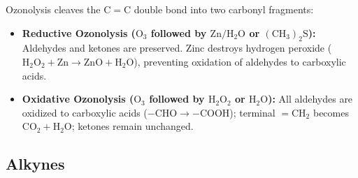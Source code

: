 \documentclass[10pt,a4paper]{article}
\begin{document}
\begin{ncertbox}
Ozonolysis cleaves the $\mathrm{C=C}$ double bond into two carbonyl fragments:
\begin{itemize}
  \item \textbf{Reductive Ozonolysis ($\mathrm{O_3}$ followed by $\mathrm{Zn / H_2O}$ or $\mathrm{(CH_3)_2S}$):} Aldehydes and ketones are preserved. Zinc destroys hydrogen peroxide ($\mathrm{H_2O_2} + \mathrm{Zn} \to \mathrm{ZnO} + \mathrm{H_2O}$), preventing oxidation of aldehydes to carboxylic acids.
  \item \textbf{Oxidative Ozonolysis ($\mathrm{O_3}$ followed by $\mathrm{H_2O_2}$ or $\mathrm{H_2O}$):} All aldehydes are oxidized to carboxylic acids ($-\mathrm{CHO} \to -\mathrm{COOH}$); terminal $=\mathrm{CH_2}$ becomes $\mathrm{CO_2} + \mathrm{H_2O}$; ketones remain unchanged.
\end{itemize}
\end{ncertbox}

\subsection{Alkynes}
\end{document}
